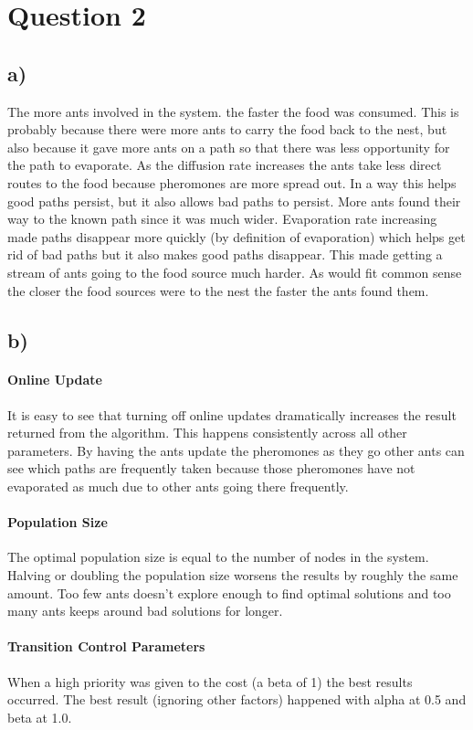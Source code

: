 \documentclass[12pt]{article}
\begin{document}
\section*{Question 2}
\subsection*{a)}
The more ants involved in the system. the faster the food was consumed. This is probably because there were more ants to carry the food back to the nest, but also because it gave more ants on a path so that there was less opportunity for the path to evaporate. As the diffusion rate increases the ants take less direct routes to the food because pheromones are more spread out. In a way this helps good paths persist, but it also allows bad paths to persist. More ants found their way to the known path since it was much wider. Evaporation rate increasing made paths disappear more quickly (by definition of evaporation) which helps get rid of bad paths but it also makes good paths disappear. This made getting a stream of ants going to the food source much harder. As would fit common sense the closer the food sources were to the nest the faster the ants found them.

\subsection*{b)}
\paragraph{Online Update}
It is easy to see that turning off online updates dramatically increases the result returned from the algorithm. This happens consistently across all other parameters. By having the ants update the pheromones as they go other ants can see which paths are frequently taken because those pheromones have not evaporated as much due to other ants going there frequently.

\paragraph{Population Size}
The optimal population size is equal to the number of nodes in the system. Halving or doubling the population size worsens the results by roughly the same amount. Too few ants doesn't explore enough to find optimal solutions and too many ants keeps around bad solutions for longer.

\paragraph{Transition Control Parameters}
When a high priority was given to the cost (a beta of 1) the best results occurred. The best result (ignoring other factors) happened with alpha at 0.5 and beta at 1.0.
\end{document}
